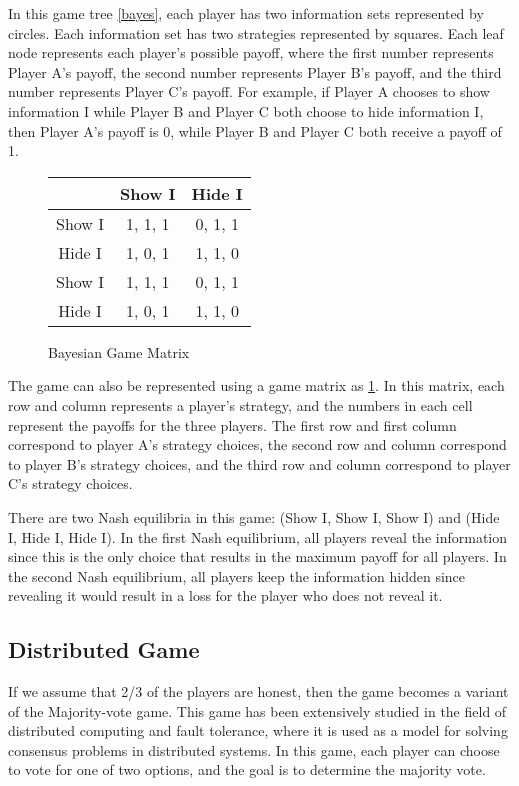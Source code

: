 \documentclass[twocolumn]{article}
\begin{document}
In this game tree \ref{bayes}, each player has two information sets represented by circles. Each information set has two strategies represented by squares. Each leaf node represents each player's possible payoff, where the first number represents Player A's payoff, the second number represents Player B's payoff, and the third number represents Player C's payoff. For example, if Player A chooses to show information I while Player B and Player C both choose to hide information I, then Player A's payoff is 0, while Player B and Player C both receive a payoff of 1.

\begin{figure}[htbp]
\begin{tabular}{c|cc}
& Show I & Hide I \\
\hline
Show I & 1, 1, 1 & 0, 1, 1 \\
Hide I & 1, 0, 1 & 1, 1, 0 \\
Show I & 1, 1, 1 & 0, 1, 1 \\
  Hide I & 1, 0, 1 & 1, 1, 0 \\
\end{tabular}
  \label{bayes mat}
  \caption{Bayesian Game Matrix}
\end{figure}


The game can also be represented using a game matrix as \ref{bayes mat}. In this matrix, each row and column represents a player's strategy, and the numbers in each cell represent the payoffs for the three players. The first row and first column correspond to player A's strategy choices, the second row and column correspond to player B's strategy choices, and the third row and column correspond to player C's strategy choices.

There are two Nash equilibria in this game: (Show I, Show I, Show I) and (Hide I, Hide I, Hide I). In the first Nash equilibrium, all players reveal the information since this is the only choice that results in the maximum payoff for all players. In the second Nash equilibrium, all players keep the information hidden since revealing it would result in a loss for the player who does not reveal it.

\subsection{Distributed Game}
If we assume that 2/3 of the players are honest, then the game becomes a variant of the Majority-vote \cite{mjv} game. This game has been extensively studied in the field of distributed computing and fault tolerance, where it is used as a model for solving consensus problems in distributed systems. In this game, each player can choose to vote for one of two options, and the goal is to determine the majority vote.
\end{document}
